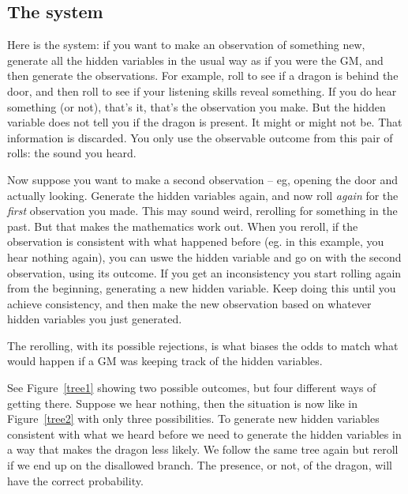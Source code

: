 \documentclass[12pt]{article}
\begin{document}
\subsection*{The system}
Here is the system: if you want to make an observation of something new,
generate all the hidden variables in the usual way as if you were the GM,
and then generate
the observations. For example, roll to see if a dragon is behind the
door, and then roll to see if your listening skills reveal something.
If you
do hear something (or not), that's it, that's the observation you
make. But the hidden variable does not tell you if the dragon is
present. It might or might not be. That information is discarded. You
only use the observable outcome from this pair of rolls: the sound you
heard.

Now suppose you want to make a second observation -- eg, opening the door
and actually looking.
Generate the hidden
variables again, and now roll \emph{again} for the \emph{first}
observation you made. This may sound weird, rerolling for something in
the past. But that makes the mathematics work out. When you reroll, if
the observation is consistent with what happened before (eg. in this
example, you hear nothing again), you can uswe the hidden variable and
go on with the second
observation, using its outcome.
If you get an inconsistency you start
rolling again from the beginning, generating a new hidden variable.
Keep doing this until
you achieve consistency, and then make the new observation based on
whatever hidden variables you just generated.

The rerolling, with its possible rejections,
is what
biases the odds to match what would happen if a GM was keeping track of
the hidden variables.

See Figure~\ref{tree1} showing two possible outcomes, but four different ways
of getting there.
Suppose we hear nothing, then the situation is now like in Figure~\ref{tree2}
with only three possibilities.
To generate new hidden variables consistent with what we heard before
we need to generate the hidden variables in a way that makes the dragon less likely.
We follow the same tree again but reroll if we end up on the disallowed
branch. The presence, or not, of the dragon, will have the correct
probability.
\end{document}
